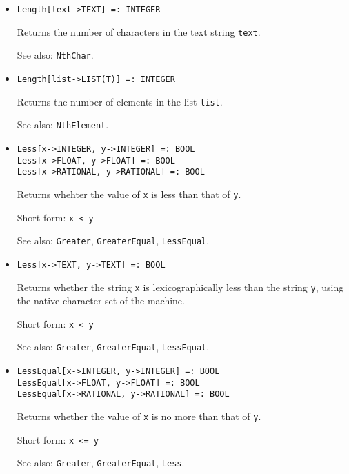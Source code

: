 \begin{itemize}
\item
\protect \large \begin{verbatim}
Length[text->TEXT] =: INTEGER
\end{verbatim}\normalsize

\bd
Returns the number of characters in the text string
\verb+text+.
\item
[See also:] {\tt NthChar}.
\ed

\item
\protect \large \begin{verbatim}
Length[list->LIST(T)] =: INTEGER
\end{verbatim}\normalsize

\bd
Returns the number of elements in the list \verb+list+.
\item
[See also:] {\tt NthElement}.
\ed

\item
\protect \large \begin{verbatim}
Less[x->INTEGER, y->INTEGER] =: BOOL
Less[x->FLOAT, y->FLOAT] =: BOOL
Less[x->RATIONAL, y->RATIONAL] =: BOOL
\end{verbatim}\normalsize

\bd
Returns whehter the value of \verb+x+ is less than that of
\verb+y+.
\item
[Short form:] \verb+x < y+
\item
[See also:] {\tt Greater}, {\tt GreaterEqual}, {\tt LessEqual}.
\ed

\item
\protect \large \begin{verbatim}
Less[x->TEXT, y->TEXT] =: BOOL
\end{verbatim}\normalsize

\bd
Returns whether the string \verb+x+ is lexicographically less than
the string \verb+y+, using the native character set of the machine.
\item
[Short form:] \verb+x < y+
\item
[See also:] {\tt Greater}, {\tt GreaterEqual}, {\tt LessEqual}.
\ed

\item
\protect \large \begin{verbatim}
LessEqual[x->INTEGER, y->INTEGER] =: BOOL
LessEqual[x->FLOAT, y->FLOAT] =: BOOL
LessEqual[x->RATIONAL, y->RATIONAL] =: BOOL
\end{verbatim}\normalsize

\bd
Returns whether the value of \verb+x+ is no more than that
of \verb+y+.
\item
[Short form:] \verb+x <= y+
\item
[See also:] {\tt Greater}, {\tt GreaterEqual}, {\tt Less}.
\ed


\end{itemize}
